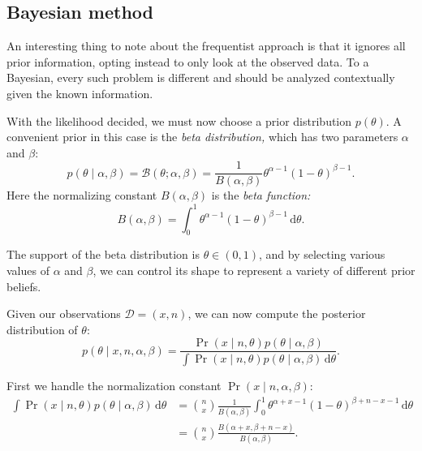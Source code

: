 \documentclass{article}
\newcommand{\given}{\mid}
\newcommand{\mc}[1]{\mathcal{#1}}
\newcommand{\data}{\mc{D}}
\newcommand{\intd}[1]{\,\mathrm{d}{#1}}
\begin{document}
\subsection*{Bayesian method}

An interesting thing to note about the frequentist approach is that it
ignores all prior information, opting instead to only look at the
observed data.  To a Bayesian, every such problem is different and
should be analyzed contextually given the known information.

With the likelihood decided, we must now choose a prior distribution
$p(\theta)$.  A convenient prior in this case is the \emph{beta
  distribution,} which has two parameters $\alpha$ and $\beta$:
\begin{equation*}
  p(\theta \given \alpha, \beta)
  =
  \mc{B}(\theta; \alpha, \beta)
  =
  \frac{1}{B(\alpha, \beta)}
  \theta^{\alpha - 1}(1 - \theta)^{\beta - 1}.
\end{equation*}
Here the normalizing constant $B(\alpha, \beta)$ is the \emph{beta
  function:}
\begin{equation*}
  B(\alpha, \beta)
  =
  \int_{0}^{1} \theta^{\alpha - 1}(1 - \theta)^{\beta - 1} \intd{\theta}.
\end{equation*}

The support of the beta distribution is $\theta \in (0, 1)$, and by
selecting various values of $\alpha$ and $\beta$, we can control its
shape to represent a variety of different prior beliefs.

Given our observations $\data = (x, n)$, we can now compute the
posterior distribution of $\theta$:
\begin{equation*}
  p(\theta \given x, n, \alpha, \beta)
  =
  \frac
      {     \Pr(x \given n, \theta) p(\theta \given \alpha, \beta)}
      {\int \Pr(x \given n, \theta) p(\theta \given \alpha, \beta) \intd{\theta}}.
\end{equation*}

First we handle the normalization constant $\Pr(x \given n, \alpha, \beta)$:
\begin{align*}
  \int \Pr(x \given n, \theta) p(\theta \given \alpha, \beta) \intd{\theta}
  &=
  \binom{n}{x}
  \frac{1}{B(\alpha, \beta)}
  \int_{0}^{1}
  \theta^{\alpha + x - 1}(1 - \theta)^{\beta + n - x - 1} \intd{\theta}
  \\
  &=
  \binom{n}{x}
  \frac{B(\alpha + x, \beta + n - x)}{B(\alpha, \beta)}.
\end{align*}
\end{document}
